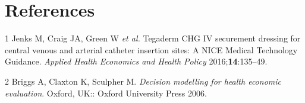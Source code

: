 \documentclass[
]{article}
\begin{document}
\hypertarget{references}{%
\section*{References}\label{references}}

\hypertarget{refs}{}
\leavevmode\hypertarget{ref-jenks:2016a}{}%
1 Jenks M, Craig JA, Green W \emph{et al.} Tegaderm CHG IV securement
dressing for central venous and arterial catheter insertion sites: A
NICE Medical Technology Guidance. \emph{Applied Health Economics and
Health Policy} 2016;\textbf{14}:135--49.

\leavevmode\hypertarget{ref-briggs:2002a}{}%
2 Briggs A, Claxton K, Sculpher M. \emph{Decision modelling for health
economic evaluation}. Oxford, UK:: Oxford University Press 2006.
\end{document}

